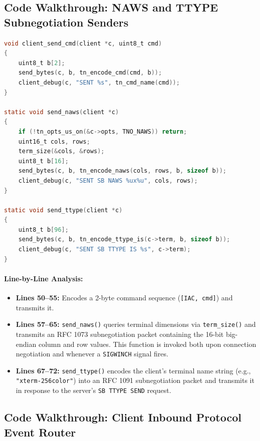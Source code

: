 \subsection{Code Walkthrough: NAWS and TTYPE Subnegotiation Senders}

\begin{lstlisting}[language=C]
void client_send_cmd(client *c, uint8_t cmd)
{
    uint8_t b[2];
    send_bytes(c, b, tn_encode_cmd(cmd, b));
    client_debug(c, "SENT %s", tn_cmd_name(cmd));
}

static void send_naws(client *c)
{
    if (!tn_opts_us_on(&c->opts, TNO_NAWS)) return;
    uint16_t cols, rows;
    term_size(&cols, &rows);
    uint8_t b[16];
    send_bytes(c, b, tn_encode_naws(cols, rows, b, sizeof b));
    client_debug(c, "SENT SB NAWS %ux%u", cols, rows);
}

static void send_ttype(client *c)
{
    uint8_t b[96];
    send_bytes(c, b, tn_encode_ttype_is(c->term, b, sizeof b));
    client_debug(c, "SENT SB TTYPE IS %s", c->term);
}
\end{lstlisting}

\paragraph{Line-by-Line Analysis:}
\begin{itemize}[leftmargin=1.5em]
    \item \textbf{Lines 50--55:} Encodes a 2-byte command sequence (\texttt{[IAC, cmd]}) and transmits it.
    \item \textbf{Lines 57--65:} \texttt{send\_naws()} queries terminal dimensions via \texttt{term\_size()} and transmits an RFC 1073 subnegotiation packet containing the 16-bit big-endian column and row values. This function is invoked both upon connection negotiation and whenever a \texttt{SIGWINCH} signal fires.
    \item \textbf{Lines 67--72:} \texttt{send\_ttype()} encodes the client's terminal name string (e.g., \texttt{"xterm-256color"}) into an RFC 1091 subnegotiation packet and transmits it in response to the server's \texttt{SB TTYPE SEND} request.
\end{itemize}

\subsection{Code Walkthrough: Client Inbound Protocol Event Router}

